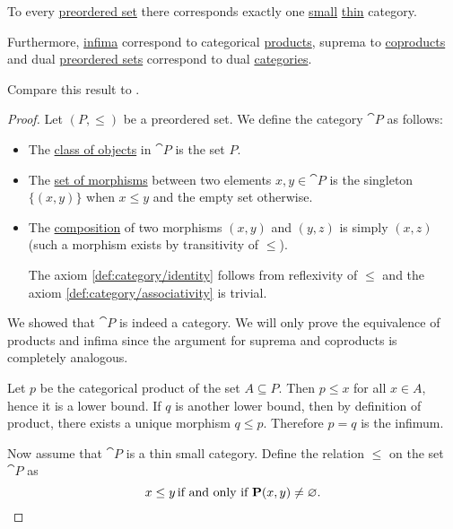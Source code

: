 \begin{proposition}\label{thm:preorder_category_correspondence}
  To every \hyperref[def:preordered_set]{preordered set} there corresponds exactly one \hyperref[def:category_cardinality]{small} \hyperref[def:thin_category]{thin} category.

  Furthermore, \hyperref[def:preordered_set/supremum_and_infimum]{infima} correspond to categorical \hyperref[def:categorical_product]{products}, suprema to \hyperref[def:categorical_coproduct]{coproducts} and dual \hyperref[def:preordered_set/duality]{preordered sets} correspond to dual \hyperref[def:opposite_category]{categories}.

  Compare this result to .
\end{proposition}
\begin{proof}
  \SufficiencySubProof Let \( (P, \leq) \) be a preordered set. We define the category \( \cat{P} \) as follows:
  \begin{itemize}
    \item The \hyperref[def:category/C1]{class of objects} in \( \cat{P} \) is the set \( P \).
    \item The \hyperref[def:category/C2]{set of morphisms} between two elements \( x, y \in \cat{P} \) is the singleton \( \{ (x, y) \} \) when \( x \leq y \) and the empty set otherwise.
    \item The \hyperref[def:category/C3]{composition} of two morphisms \( (x, y) \) and \( (y, z) \) is simply \( (x, z) \) (such a morphism exists by transitivity of \( \leq \)).

    The axiom \ref{def:category/identity} follows from reflexivity of \( \leq \) and the axiom \ref{def:category/associativity} is trivial.
  \end{itemize}

  We showed that \( \cat{P} \) is indeed a category. We will only prove the equivalence of products and infima since the argument for suprema and coproducts is completely analogous.

  Let \( p \) be the categorical product of the set \( A \subseteq P \). Then \( p \leq x \) for all \( x \in A \), hence it is a lower bound. If \( q \) is another lower bound, then by definition of product, there exists a unique morphism \( q \leq p \). Therefore \( p = q \) is the infimum.

  \NecessitySubProof Now assume that \( \cat{P} \) is a thin small category. Define the relation \( \leq \) on the set \( \cat{P} \) as
  \begin{equation*}
    x \leq y \T{if and only if} \cat{P}(x, y) \neq \varnothing.
  \end{equation*}


\end{proof}
